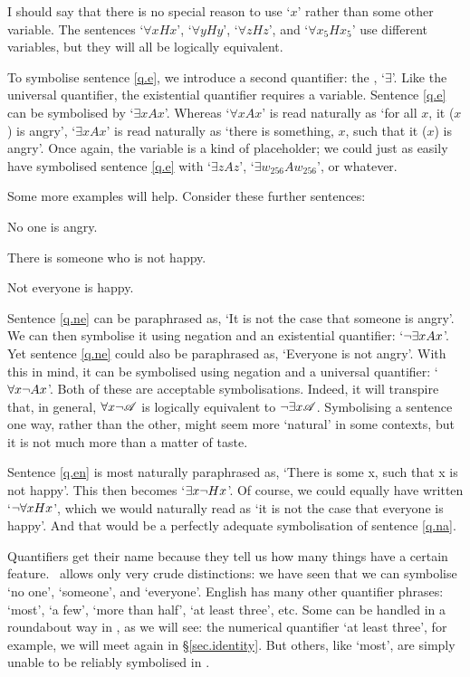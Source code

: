 I should say that there is no special reason to use `$x$' rather than some other variable. The sentences `$\forall x Hx$', `$\forall y Hy$', `$\forall z Hz$', and `$\forall x_5 Hx_5$' use different variables, but they will all be logically equivalent.

To symbolise sentence \ref{q.e}, we introduce a second quantifier: the , `$\exists$'. Like the universal quantifier, the existential quantifier requires a variable. Sentence \ref{q.e} can be symbolised by `$\exists x Ax$'. Whereas `$\forall x Ax$' is read naturally as `for all $x$, it ($x$) is angry', `$\exists x Ax$' is read naturally as `there is something, $x$, such that it ($x$) is angry'. Once again, the variable is a kind of placeholder; we could just as easily have symbolised sentence \ref{q.e} with `$\exists z Az$', `$\exists w_{256} Aw_{256}$', or whatever.

Some more examples will help. Consider these further sentences:
	\begin{earg}
		\item[\ex{q.ne}] No one is angry.
		\item[\ex{q.en}] There is someone who is not happy.
		\item[\ex{q.na}] Not everyone is happy.
	\end{earg}
Sentence \ref{q.ne} can be paraphrased as, `It is not the case that someone is angry'. We can then symbolise it using negation and an existential quantifier: `$\neg \exists x Ax$'. Yet sentence \ref{q.ne} could also be paraphrased as, `Everyone is not angry'. With this in mind, it can be symbolised using negation and a universal quantifier: `$\forall x \neg Ax$'. Both of these are acceptable symbolisations.  Indeed, it will transpire that, in general, $\forall x \neg\mathscr{A}$ is logically equivalent to $\neg\exists x\mathscr{A}$.  Symbolising a sentence one way, rather than the other, might seem more `natural' in some contexts, but it is not much more than a matter of taste.

Sentence \ref{q.en} is most naturally paraphrased as, `There is some x, such that x is not happy'. This then becomes `$\exists x \neg Hx$'. Of course, we could equally have written `$\neg\forall x Hx$', which we would naturally read as `it is not the case that everyone is happy'. And that would be a perfectly adequate symbolisation of sentence \ref{q.na}.

Quantifiers get their name because they tell us how many things have a certain feature. \FOL\ allows only very crude distinctions: we have seen that we can symbolise `no one', `someone', and `everyone'. 
English has many other quantifier phrases: `most', `a few', `more than half', `at least three', etc. Some can be handled in a roundabout way in \FOL, as we will see: the numerical quantifier `at least three', for example, we will meet again in §\ref{sec.identity}. But others, like `most', are simply unable to be reliably symbolised in \FOL. 

